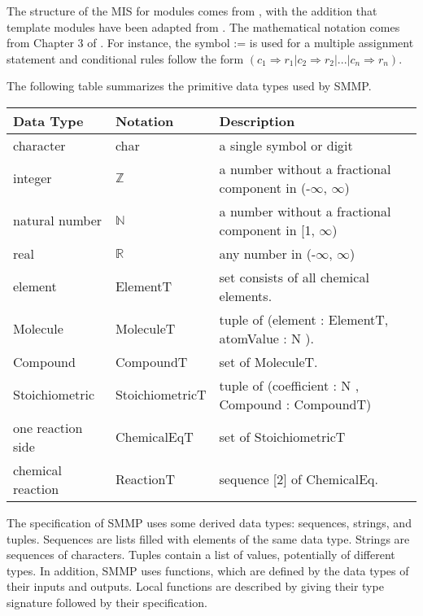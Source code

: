 \documentclass[12pt, titlepage]{article}
\begin{document}
The structure of the MIS for modules comes from \cite{HoffmanAndStrooper1995},
with the addition that template modules have been adapted from
\cite{GhezziEtAl2003}.  The mathematical notation comes from Chapter 3 of
\cite{HoffmanAndStrooper1995}.  For instance, the symbol := is used for a
multiple assignment statement and conditional rules follow the form $(c_1
\Rightarrow r_1 | c_2 \Rightarrow r_2 | ... | c_n \Rightarrow r_n )$.

The following table summarizes the primitive data types used by SMMP. 

\begin{center}
\renewcommand{\arraystretch}{1.2}
\noindent 
\begin{tabular}{l l p{7.5cm}} 
\toprule 
\textbf{Data Type} & \textbf{Notation} & \textbf{Description}\\ 
\midrule
character & char & a single symbol or digit\\
integer & $\mathbb{Z}$ & a number without a fractional component in (-$\infty$, $\infty$) \\
natural number & $\mathbb{N}$ & a number without a fractional component in [1, $\infty$) \\
real & $\mathbb{R}$ & any number in (-$\infty$, $\infty$)\\
element & ElementT & set consists of all chemical elements.\\
Molecule & MoleculeT  & tuple of (element : ElementT, atomValue : N ).\\
Compound & CompoundT  & set of MoleculeT.\\
Stoichiometric & StoichiometricT & tuple of (coefficient : N , Compound : CompoundT)\\
one reaction side & ChemicalEqT & set of StoichiometricT\\
chemical reaction & ReactionT & sequence [2] of ChemicalEq.\\
\bottomrule
\end{tabular} 
\end{center}

\noindent
The specification of SMMP  uses some derived data types: sequences, strings, and
tuples. Sequences are lists filled with elements of the same data type. Strings
are sequences of characters. Tuples contain a list of values, potentially of
different types. In addition, SMMP  uses functions, which
are defined by the data types of their inputs and outputs. Local functions are
described by giving their type signature followed by their specification.
\end{document}
